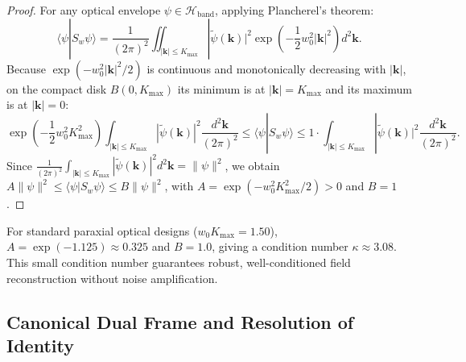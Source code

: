 \documentclass{optica-article}
\begin{document}
\begin{proof}
For any optical envelope $\psi \in \mathcal{H}_{\text{band}}$, applying Plancherel's theorem:
\begin{equation}
\langle \psi | S_w \psi \rangle = \frac{1}{(2\pi)^2} \iint_{|\mathbf{k}| \le K_{\max}} |\widetilde{\psi}(\mathbf{k})|^2 \exp\left( - \frac{1}{2} w_0^2 |\mathbf{k}|^2 \right) d^2\mathbf{k}.
\label{eq:plancherel_frame}
\end{equation}
Because $\exp(-w_0^2 |\mathbf{k}|^2 / 2)$ is continuous and monotonically decreasing with $|\mathbf{k}|$, on the compact disk $B(0, K_{\max})$ its minimum is at $|\mathbf{k}| = K_{\max}$ and its maximum is at $|\mathbf{k}| = 0$:
\begin{equation}
\exp\left( - \frac{1}{2} w_0^2 K_{\max}^2 \right) \int_{|\mathbf{k}| \le K_{\max}} |\widetilde{\psi}(\mathbf{k})|^2 \frac{d^2\mathbf{k}}{(2\pi)^2} \le \langle \psi | S_w \psi \rangle \le 1 \cdot \int_{|\mathbf{k}| \le K_{\max}} |\widetilde{\psi}(\mathbf{k})|^2 \frac{d^2\mathbf{k}}{(2\pi)^2}.
\label{eq:frame_bounds_sandwiched}
\end{equation}
Since $\frac{1}{(2\pi)^2} \int_{|\mathbf{k}| \le K_{\max}} |\widetilde{\psi}(\mathbf{k})|^2 d^2\mathbf{k} = \|\psi\|^2$, we obtain $A \|\psi\|^2 \le \langle \psi | S_w \psi \rangle \le B \|\psi\|^2$, with $A = \exp(-w_0^2 K_{\max}^2 / 2) > 0$ and $B = 1$.
\end{proof}

For standard paraxial optical designs ($w_0 K_{\max} = 1.50$), $A = \exp(-1.125) \approx 0.325$ and $B = 1.0$, giving a condition number $\kappa \approx 3.08$. This small condition number guarantees robust, well-conditioned field reconstruction without noise amplification.

\subsection{Canonical Dual Frame and Resolution of Identity}
\end{document}
